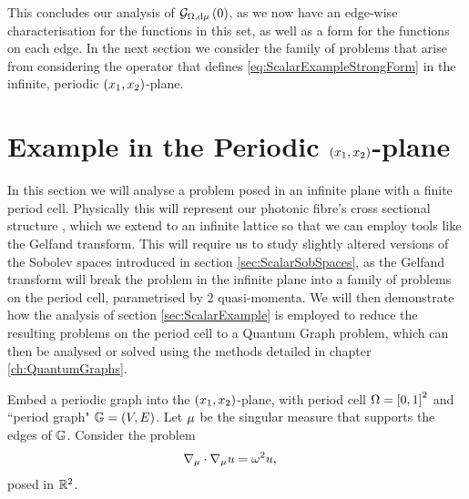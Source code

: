 This concludes our analysis of $\mathcal{G}_{ \Omega, \mathrm{d}\mu}\left( 0 \right)$, as we now have an edge-wise characterisation for the functions in this set, as well as a form for the functions on each edge.
In the next section we consider the family of problems that arise from considering the operator that defines \eqref{eq:ScalarExampleStrongForm} in the infinite, periodic $\left( x_1,x_2 \right)$-plane.

\section{Example in the Periodic $\left( x_1,x_2 \right)$-plane} \label{sec:ScalarSystem}
In this section we will analyse a problem posed in an infinite plane with a finite period cell.
Physically this will represent our photonic fibre's cross sectional structure , which we extend to an infinite lattice so that we can employ tools like the Gelfand transform.
This will require us to study slightly altered versions of the Sobolev spaces introduced in section \ref{sec:ScalarSobSpaces}, as the Gelfand transform will break the problem in the infinite plane into a family of problems on the period cell, parametrised by 2 quasi-momenta.
We will then demonstrate how the analysis of section \ref{sec:ScalarExample} is employed to reduce the resulting problems on the period cell to a Quantum Graph problem, which can then be analysed or solved using the methods detailed in chapter \ref{ch:QuantumGraphs}. \newline

Embed a periodic graph into the $\left( x_1,x_2 \right)$-plane, with period cell $\Omega = \left[ 0,1 \right]^2$ and ``period graph" $\mathbb{G}=(V,E)$.
Let $\mu$ be the singular measure that supports the edges of $\mathbb{G}$. 
Consider the problem
\begin{align} \label{eq:WholeSpaceScalarProblem}
	\nabla_\mu \cdot \nabla_\mu u &= \omega^2 u,
\end{align}
posed in $\mathbb{R}^2$. 

